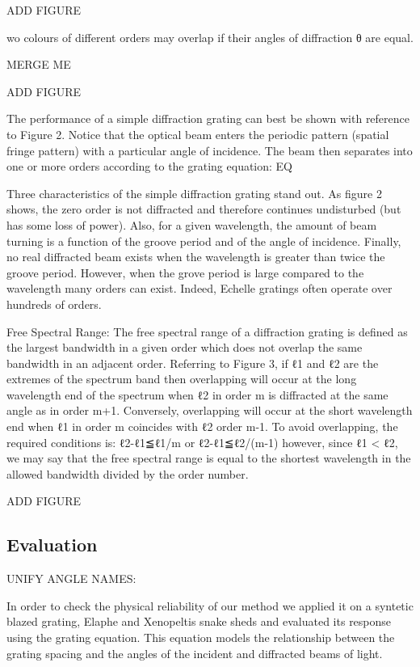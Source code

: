 ADD FIGURE

wo colours of different orders may overlap if their angles of diffraction θ are equal. 

MERGE ME

ADD FIGURE

The performance of a simple diffraction grating can best be shown with reference to Figure 2. Notice that the optical beam enters the periodic pattern (spatial fringe pattern) with a particular angle of incidence. The beam then separates into one or more orders according to the grating equation: EQ

Three characteristics of the simple diffraction grating stand out. As figure 2 shows, the zero order is not diffracted and therefore continues undisturbed (but has some loss of power). Also, for a given wavelength, the amount of beam turning is a function of the groove period and of the angle of incidence. Finally, no real diffracted beam exists when the wavelength is greater than twice the groove period. However, when the grove period is large compared to the wavelength many orders can exist. Indeed, Echelle gratings often operate over hundreds of orders.

Free Spectral Range:
The free spectral range of a diffraction grating is defined as the largest bandwidth in a given order which does not overlap the same bandwidth in an adjacent order. Referring to Figure 3, if ℓ1 and ℓ2 are the extremes of the spectrum band then overlapping will occur at the long wavelength end of the spectrum when ℓ2 in order m is diffracted at the same angle as in order m+1. Conversely, overlapping will occur at the short wavelength end when ℓ1 in order m coincides with ℓ2 order m-1. To avoid overlapping, the required conditions is:
ℓ2-ℓ1≦ℓ1/m or ℓ2-ℓ1≦ℓ2/(m-1)
however, since ℓ1 < ℓ2, we may say that the free spectral range is equal to the shortest wavelength in the allowed bandwidth divided by the order number.

ADD FIGURE


\subsection{Evaluation}
UNIFY ANGLE NAMES: 

In order to check the physical reliability of our method we applied it on a syntetic blazed grating, Elaphe and Xenopeltis snake sheds and evaluated its response using the grating equation. This equation models the relationship between the grating spacing and the angles of the incident and diffracted beams of light. 

